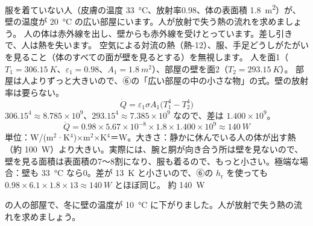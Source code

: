 \begin{phreidai}[部屋の中の人が放射で失う熱]
\label{ph:熱-13:ex5}服を着ていない人（皮膚の温度 \qty{33}{\celsius}、放射率0.98、体の表面積 \qty{1.8}{m^2}）が、壁の温度が \qty{20}{\celsius} の広い部屋にいます。人が放射で失う熱の流れを求めましょう。
\phbamen
人の体は赤外線を出し、壁からも赤外線を受けとっています。差し引きで、人は熱を失います。
\phmushi
空気による対流の熱（熱-12）、服、手足どうしがたがいを見ること（体のすべての面が壁を見るとする）を無視します。
\phzu
人を面1（$T_1=\qty{306.15}{K}$、$\varepsilon_1=0.98$、$A_1=\qty{1.8}{m^2}$）、部屋の壁を面2（$T_2=\qty{293.15}{K}$）。
\phriyu
部屋は人よりずっと大きいので、⑥の「広い部屋の中の小さな物」の式。壁の放射率は要らない。
\phtateru
\[ \dot Q=\varepsilon_1\sigma A_1\bigl(T_1^4-T_2^4\bigr) \]
\phtoku
$306.15^4\approx8.785\times10^9$、$293.15^4\approx7.385\times10^9$ なので、差は $1.400\times10^9$。
\[ \dot Q=0.98\times5.67\times10^{-8}\times1.8\times1.400\times10^9\approx\qty{140}{W} \]
\phtashikame
単位：W/(m$^2$·K$^4$)×m$^2$×K$^4$＝W。大きさ：静かに休んでいる人の体が出す熱（約 \qty{100}{W}）より大きい。実際には、腕と胴が向き合う所は壁を見ないので、壁を見る面積は表面積の7〜8割になり、服も着るので、もっと小さい。極端な場合：壁も \qty{33}{\celsius} なら0。差が \qty{13}{K} と小さいので、⑥の $h_{\mathrm r}$ を使っても $0.98\times6.1\times1.8\times13\approx\qty{140}{W}$ とほぼ同じ。
\kotae 約 \qty{140}{W}
\end{phreidai}
\begin{jibun}
の人の部屋で、冬に壁の温度が \qty{10}{\celsius} に下がりました。人が放射で失う熱の流れを求めましょう。
\end{jibun}

